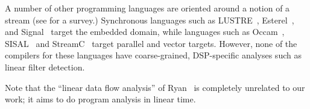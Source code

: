 A number of other programming languages are oriented around a notion
of a stream (see \cite{survey97} for a survey.)  Synchronous languages
such as LUSTRE~\cite{lustre}, Esterel~\cite{esterel92}, and
Signal~\cite{signal} target the embedded domain, while languages such
as Occam~\cite{occammanual}, SISAL~\cite{sisal} and StreamC~\cite{Rix98}
target parallel and vector targets.  However, none of the compilers
for these languages have coarse-grained, DSP-specific analyses such as
linear filter detection.

Note that the ``linear data flow analysis'' of Ryan~\cite{ryan92} is
completely unrelated to our work; it aims to do program analysis in
linear time.

